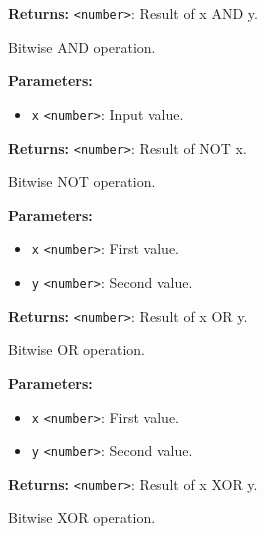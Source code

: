\documentclass[12pt,a4paper]{article}
\begin{document}
\noindent \textbf{Returns:} \texttt{<number>}: Result of \textasciigrave{}x AND y\textasciigrave{}.

\noindent Bitwise AND operation.

\vspace{5mm}
\noindent {}


\noindent \textbf{Parameters:}
\begin{itemize}
  \item \texttt{x} \texttt{<number>}: Input value.
\end{itemize}

\noindent \textbf{Returns:} \texttt{<number>}: Result of \textasciigrave{}NOT x\textasciigrave{}.

\noindent Bitwise NOT operation.

\vspace{5mm}
\noindent {}


\noindent \textbf{Parameters:}
\begin{itemize}
  \item \texttt{x} \texttt{<number>}: First value.
  \item \texttt{y} \texttt{<number>}: Second value.
\end{itemize}

\noindent \textbf{Returns:} \texttt{<number>}: Result of \textasciigrave{}x OR y\textasciigrave{}.

\noindent Bitwise OR operation.

\vspace{5mm}
\noindent {}


\noindent \textbf{Parameters:}
\begin{itemize}
  \item \texttt{x} \texttt{<number>}: First value.
  \item \texttt{y} \texttt{<number>}: Second value.
\end{itemize}

\noindent \textbf{Returns:} \texttt{<number>}: Result of \textasciigrave{}x XOR y\textasciigrave{}.

\noindent Bitwise XOR operation.
\end{document}
